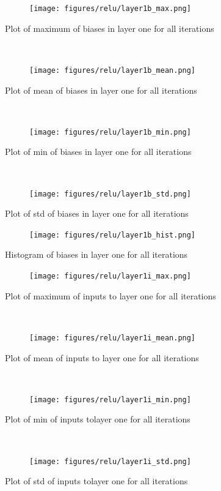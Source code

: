 \documentclass[]{article}
\begin{document}
\begin{figure}[ht]
    \centering
    \begin{subfigure}
        \centering
        \texttt{[image: figures/relu/layer1b\_max.png]}
    \end{subfigure}%
    \caption{Plot of maximum of biases in layer one for all iterations}
 \label{fig:/layer1b_max}
    ~ 
    \centering
    \begin{subfigure}
        \centering
        \texttt{[image: figures/relu/layer1b\_mean.png]}
    \end{subfigure}%
    \caption{Plot of mean of biases in layer one for all iterations}
 \label{fig:/layer1b_mean}
    ~ 
    \centering
    \begin{subfigure}
        \centering
        \texttt{[image: figures/relu/layer1b\_min.png]}
    \end{subfigure}%
    \caption{Plot of min of biases in layer one for all iterations}
 \label{fig:/layer1b_min}
    ~ 
    \centering
    \begin{subfigure}
        \centering
        \texttt{[image: figures/relu/layer1b\_std.png]}
    \end{subfigure}%
    \caption{Plot of std of biases in layer one for all iterations}
 \label{fig:/layer1b_std}
\end{figure}

\begin{figure}
    \centering
    \begin{subfigure}
        \centering
        \texttt{[image: figures/relu/layer1b\_hist.png]}
    \end{subfigure}%
    \caption{Histogram of biases in layer one for all iterations}
 \label{fig:/layer1b_hist}
\end{figure}



\begin{figure}[ht]
    \centering
    \begin{subfigure}
        \centering
        \texttt{[image: figures/relu/layer1i\_max.png]}
    \end{subfigure}%
    \caption{Plot of maximum of inputs to layer one for all iterations}
 \label{fig:/layer1i_max}
    ~ 
    \centering
    \begin{subfigure}
        \centering
        \texttt{[image: figures/relu/layer1i\_mean.png]}
    \end{subfigure}%
    \caption{Plot of mean of inputs to layer one for all iterations}
 \label{fig:/layer1i_mean}
    ~ 
    \centering
    \begin{subfigure}
        \centering
        \texttt{[image: figures/relu/layer1i\_min.png]}
    \end{subfigure}%
    \caption{Plot of min of inputs tolayer one for all iterations}
 \label{fig:/layer1i_min}
    ~ 
    \centering
    \begin{subfigure}
        \centering
        \texttt{[image: figures/relu/layer1i\_std.png]}
    \end{subfigure}%
    \caption{Plot of std of inputs tolayer one for all iterations}
 \label{fig:/layer1i_std}
\end{figure}
\end{document}
